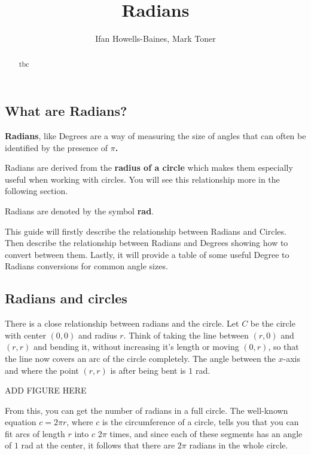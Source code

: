 \documentclass[
  12pt,
  a4paper, oneside]{starmastarticle}
\title{Radians}
\author{Ifan Howells-Baines, Mark Toner}
\date{}
\begin{document}
\maketitle
\begin{abstract}
tbc
\end{abstract}
\ifdefined\Shaded\renewenvironment{Shaded}{\begin{tcolorbox}[borderline west={3pt}{0pt}{shadecolor}, frame hidden, interior hidden, enhanced, breakable, sharp corners, boxrule=0pt]}{\end{tcolorbox}}\fi

\hypertarget{what-are-radians}{%
\subsection*{What are Radians?}\label{what-are-radians}}

\textbf{Radians}, like Degrees are a way of measuring the size of angles
that can often be identified by the presence of \textbf{\(\pi\).}

Radians are derived from the \textbf{radius of a circle} which makes
them especially useful when working with circles. You will see this
relationship more in the following section.

Radians are denoted by the symbol \textbf{rad}.

This guide will firstly describe the relationship between Radians and
Circles. Then describe the relationship between Radians and Degrees
showing how to convert between them. Lastly, it will provide a table of
some useful Degree to Radians conversions for common angle sizes.

\hypertarget{radians-and-circles}{%
\subsection{Radians and circles}\label{radians-and-circles}}

There is a close relationship between radians and the circle. Let \(C\)
be the circle with center \((0,0)\) and radius \(r\). Think of taking
the line between \((r,0)\) and \((r,r)\) and bending it, without
increasing it's length or moving \((0,r)\), so that the line now covers
an arc of the circle completely. The angle between the \(x\)-axis and
where the point \((r,r)\) is after being bent is \(1\) rad.

ADD FIGURE HERE

From this, you can get the number of radians in a full circle. The
well-known equation \(c = 2 \pi r\), where \(c\) is the circumference of
a circle, tells you that you can fit arcs of length \(r\) into \(c\)
\(2\pi\) times, and since each of these segments has an angle of \(1\)
rad at the center, it follows that there are \(2\pi\) radians in the
whole circle.
\end{document}
